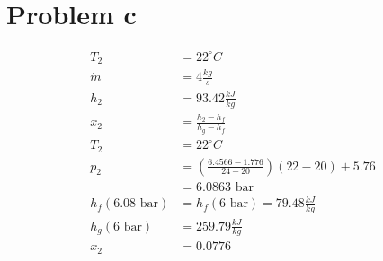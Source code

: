 \section*{Problem c}

\begin{align*}
T_2 &= 22^\circ C \\
\dot{m} &= 4 \frac{kg}{s} \\
h_2 &= 93.42 \frac{kJ}{kg} \\
x_2 &= \frac{h_2 - h_f}{h_g - h_f} \\
T_2 &= 22^\circ C \\
p_2 &= \left( \frac{6.4566 - 1.776}{24 - 20} \right) (22 - 20) + 5.76 \\
&= 6.0863 \text{ bar} \\
h_f (6.08 \text{ bar}) &= h_f (6 \text{ bar}) = 79.48 \frac{kJ}{kg} \\
h_g (6 \text{ bar}) &= 259.79 \frac{kJ}{kg} \\
x_2 &= 0.0776
\end{align*}